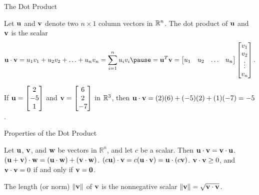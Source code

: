\documentclass[xcolor=dvipsnames,aspectratio=169,t]{beamer}
\begin{document}
\begin{frame}{The Dot Product}
  \begin{definition}
    Let $\mathbf{u}$ and $\mathbf{v}$ denote two $n \times 1$ column vectors in $\mathbb{R}^n$. 
    The \alert{dot product} %
    of $\mathbf{u}$ and $\mathbf{v}$ is the scalar%
    \[ \u \cdot \v = u_1v_1 + u_2 v_2 + \ldots + u_nv_n = \sum_{i=1}^n u_iv_i 
    \pause
    = \u^T \v 
    = \begin{bmatrix} u_1 & u_2 & \ldots & u_n \end{bmatrix} 
      \begin{bmatrix} v_1 \\ v_2 \\ \vdots \\ v_n \end{bmatrix}.
    \]
  \end{definition}
  \bigskip

  \pause
  \smallskip
  
  If $\mathbf{u} = \begin{bmatrix} 2 \\ -5 \\ 1 \end{bmatrix}$ and 
     $\mathbf{v} = \begin{bmatrix} 6 \\ 2 \\ -7 \end{bmatrix}$ in $\mathbb{R}^3$, 
     then $\mathbf{u} \cdot \mathbf{v} = (2)(6)+ (-5)(2) + (1)(-7) = -5$.
\end{frame}


\begin{frame}{Properties of the Dot Product}

  \begin{theorem}
  Let $\mathbf{u}$, $\mathbf{v}$, and $\mathbf{w}$ be vectors in $\mathbb{R}^n$, and let $c$ be a scalar. Then \smallskip
  \bb[(a)]
  \ii $ \mathbf{u} \cdot \mathbf{v}  =  \mathbf{v} \cdot \mathbf{u} $. \medskip
  \ii $(\mathbf{u} + \mathbf{v}) \cdot \mathbf{w} = (\mathbf{u} \cdot \mathbf{w}) + (\mathbf{v} \cdot \mathbf{w})$. \medskip
  \ii $(c \mathbf{u}) \cdot \mathbf{v} = c(\mathbf{u} \cdot \mathbf{v}) = \mathbf{u} \cdot (c \mathbf{v})$. \medskip
  \ii $\mathbf{v} \cdot \mathbf{v} \geq 0$, and $\mathbf{v} \cdot \mathbf{v} =0$ if and only if $\mathbf{v} = \mathbf{0}$. \medskip
  \ee
  \end{theorem}

  \bigskip

  \pause
  \begin{definition}
  The \alert{length} (or \alert{norm}) $\| \mathbf{v} \|$ of $\mathbf{v}$ is the nonnegative scalar $\| \mathbf{v} \| = \sqrt{ \mathbf{v} \cdot \mathbf{v}}$.
  \end{definition}
\end{frame}
\end{document}
